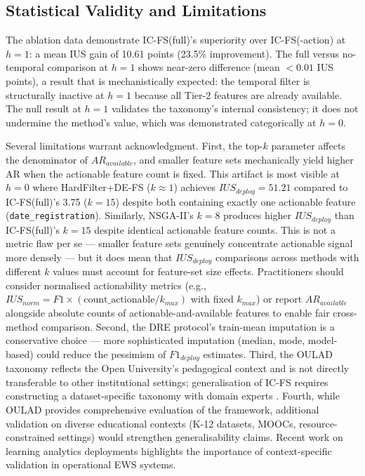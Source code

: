 \documentclass[a4paper,fleqn]{cas-sc}
\begin{document}
\subsection{Statistical Validity and Limitations}

The ablation data demonstrate IC-FS(full)'s superiority over IC-FS(-action) at $h=1$: a mean IUS gain of 10.61 points (23.5\% improvement). The full versus no-temporal comparison at $h=1$ shows near-zero difference (mean $< 0.01$ IUS points), a result that is mechanistically expected: the temporal filter is structurally inactive at $h=1$ because all Tier-2 features are already available. The null result at $h=1$ validates the taxonomy's internal consistency; it does not undermine the method's value, which was demonstrated categorically at $h=0$.

Several limitations warrant acknowledgment. First, the top-$k$ parameter affects the denominator of $AR_{available}$, and smaller feature sets mechanically yield higher AR when the actionable feature count is fixed. This artifact is most visible at $h=0$ where HardFilter+DE-FS ($k \approx 1$) achieves $IUS_{deploy}=51.21$ compared to IC-FS(full)'s 3.75 ($k=15$) despite both containing exactly one actionable feature (\texttt{date\_registration}). Similarly, NSGA-II's $k=8$ produces higher $IUS_{deploy}$ than IC-FS(full)'s $k=15$ despite identical actionable feature counts. This is not a metric flaw per se --- smaller feature sets genuinely concentrate actionable signal more densely --- but it does mean that $IUS_{deploy}$ comparisons across methods with different $k$ values must account for feature-set size effects. Practitioners should consider normalised actionability metrics (e.g., $IUS_{norm} = F1 \times (\text{count\_actionable}/k_{max})$ with fixed $k_{max}$) or report $AR_{available}$ alongside absolute counts of actionable-and-available features to enable fair cross-method comparison. Second, the DRE protocol's train-mean imputation is a conservative choice --- more sophisticated imputation (median, mode, model-based) could reduce the pessimism of $F1_{deploy}$ estimates. Third, the OULAD taxonomy reflects the Open University's pedagogical context and is not directly transferable to other institutional settings; generalisation of IC-FS requires constructing a dataset-specific taxonomy with domain experts \cite{viberg2020, tsai2024}. Fourth, while OULAD provides comprehensive evaluation of the framework, additional validation on diverse educational contexts (K-12 datasets, MOOCs, resource-constrained settings) would strengthen generalisability claims. Recent work on learning analytics deployments \cite{slater2022, lodge2023} highlights the importance of context-specific validation in operational EWS systems.
\end{document}
